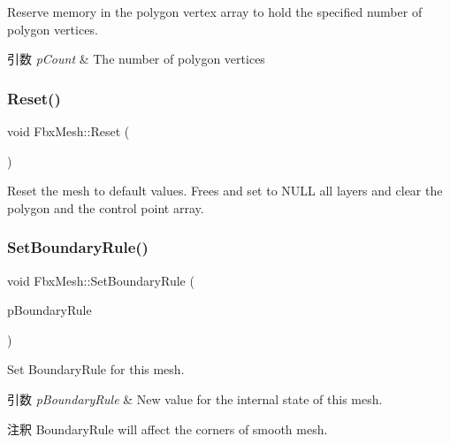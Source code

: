 Reserve memory in the polygon vertex array to hold the specified number of polygon vertices. 
\begin{DoxyParams}{引数}
{\em p\+Count} & The number of polygon vertices \\
\hline
\end{DoxyParams}
\mbox{\label{class_fbx_mesh_addb08ad4590a4fcdaf575dbf16c490fd}} 
\subsubsection{\texorpdfstring{Reset()}{Reset()}}
{\footnotesize\ttfamily void Fbx\+Mesh\+::\+Reset (\begin{DoxyParamCaption}{ }\end{DoxyParamCaption})}

Reset the mesh to default values. Frees and set to {\ttfamily N\+U\+LL} all layers and clear the polygon and the control point array. \mbox{\label{class_fbx_mesh_a36ab48a31065c607af8ad8a554fab6c6}} 
\subsubsection{\texorpdfstring{Set\+Boundary\+Rule()}{SetBoundaryRule()}}
{\footnotesize\ttfamily void Fbx\+Mesh\+::\+Set\+Boundary\+Rule (\begin{DoxyParamCaption}\item[{\hyperlink{class_fbx_mesh_ab9e7d41ffcd49467a374c72e0d6f3561}{E\+Boundary\+Rule}}]{p\+Boundary\+Rule }\end{DoxyParamCaption})}

Set Boundary\+Rule for this mesh. 
\begin{DoxyParams}{引数}
{\em p\+Boundary\+Rule} & New value for the internal state of this mesh. \\
\hline
\end{DoxyParams}
\begin{DoxyRemark}{注釈}
Boundary\+Rule will affect the corners of smooth mesh. 
\end{DoxyRemark}
\mbox{\label{class_fbx_mesh_ae9cf093a067ebc761231f1f186695d67}} 
